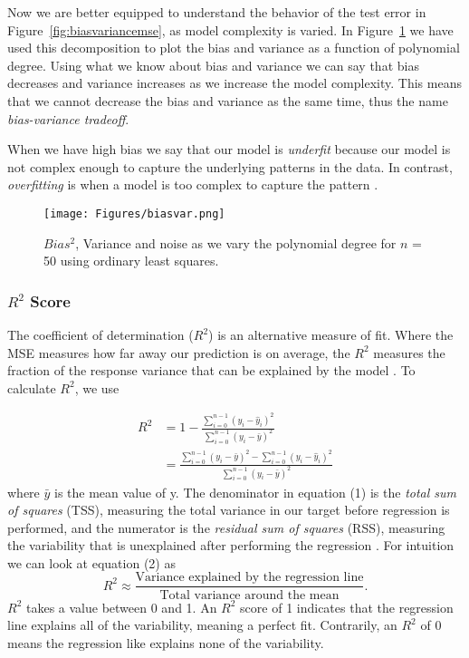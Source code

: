 \documentclass[amssymb,twocolumn,aps]{revtex4}
\begin{document}
Now we are better equipped to understand the behavior of the test error in Figure~\ref{fig:biasvariancemse}, as model complexity is varied. In Figure~\ref{fig:biasvar} we have used this decomposition to plot the bias and variance as a function of polynomial degree. Using what we know about bias and variance we can say that bias decreases and variance increases as we increase the model complexity. This means that we cannot decrease the bias and variance as the same time, thus the name \textit{bias-variance tradeoff}.

When we have high bias we say that our model is \textit{underfit} because our model is not complex enough to capture the underlying patterns in the data. In contrast, \textit{overfitting} is when a model is too complex to capture the pattern \cite{rasch3}.

\begin{figure}[h]
    \centering
    \texttt{[image: Figures/biasvar.png]}
    \caption{$Bias^2$, Variance and noise as we vary the polynomial degree for $n$ = 50 using ordinary least squares.}
    \label{fig:biasvar}
\end{figure}


\FloatBarrier
\subsubsection{$R^2$ Score}

The coefficient of determination ($R^2$) is an alternative measure of fit. Where the MSE measures how far away our prediction is on average, the $R^2$ measures the fraction of the response variance that can be explained by the model \cite{rasch4} \cite{fysml7}. To calculate $R^2$, we use

\begin{align}
    R^{2} & = 1 - \frac{\sum_{i=0}^{n-1} (y_i - \hat{y}_i)^2}{\sum_{i=0}^{n-1} (y_i - \bar{y})^2}                                   \\
          & =  \frac{ \sum_{i=0}^{n-1} (y_i - \bar{y})^2- \sum_{i=0}^{n-1} (y_i - \hat{y}_i)^2}{\sum_{i=0}^{n-1} (y_i - \bar{y})^2}
\end{align}
where $\bar{y}$ is the mean value of y. The denominator in equation (1) is the \textit{total sum of squares} (TSS), measuring the total variance in our target before regression is performed, and the numerator is the \textit{residual sum of squares} (RSS), measuring the variability that is unexplained after performing the regression \cite{introstat4}. For intuition we can look at equation (2) as
$$R^2 \approx \frac{\text{Variance explained by the regression line}}{\text{Total variance around the mean}}.$$
$R^2$ takes a value between 0 and 1. An $R^2$ score of 1 indicates that the regression line explains all of the variability, meaning a perfect fit. Contrarily, an $R^2$ of 0 means the regression like explains none of the variability.
\end{document}
